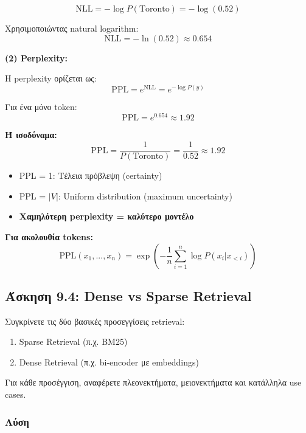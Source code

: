 $$\text{NLL} = -\log P(\text{Toronto}) = -\log(0.52)$$

Χρησιμοποιώντας natural logarithm:
$$\text{NLL} = -\ln(0.52) \approx 0.654$$

\textbf{(2) Perplexity:}

Η perplexity ορίζεται ως:
$$\text{PPL} = e^{\text{NLL}} = e^{-\log P(y)}$$

Για ένα μόνο token:
$$\text{PPL} = e^{0.654} \approx 1.92$$

\textbf{Ή ισοδύναμα:}
$$\text{PPL} = \frac{1}{P(\text{Toronto})} = \frac{1}{0.52} \approx 1.92$$

\begin{infobox}
\begin{itemize}
    \item PPL = 1: Τέλεια πρόβλεψη (certainty)
    \item PPL = $|V|$: Uniform distribution (maximum uncertainty)
    \item \textbf{Χαμηλότερη perplexity = καλύτερο μοντέλο}
\end{itemize}
\end{infobox}

\textbf{Για ακολουθία tokens:}
$$\text{PPL}(x_1, ..., x_n) = \exp\left(-\frac{1}{n}\sum_{i=1}^{n}\log P(x_i | x_{<i})\right)$$

\subsection{Άσκηση 9.4: Dense vs Sparse Retrieval}

\begin{formulabox}[Εκφώνηση]
Συγκρίνετε τις δύο βασικές προσεγγίσεις retrieval:
\begin{enumerate}
    \item Sparse Retrieval (π.χ. BM25)
    \item Dense Retrieval (π.χ. bi-encoder με embeddings)
\end{enumerate}

Για κάθε προσέγγιση, αναφέρετε πλεονεκτήματα, μειονεκτήματα και κατάλληλα use cases.
\end{formulabox}

\subsubsection*{Λύση}

